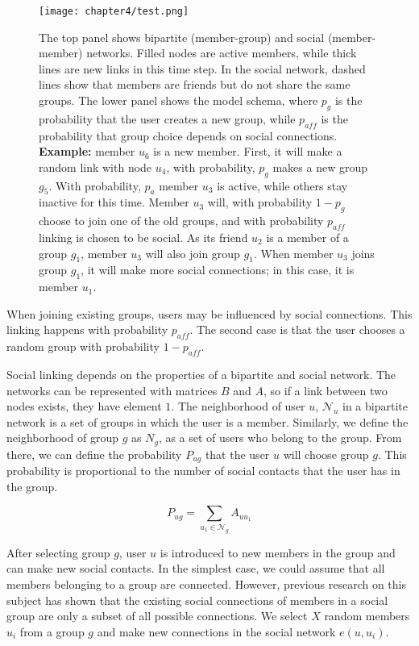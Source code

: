 \begin{figure}[h]
	\centering
	\texttt{[image: chapter4/test.png]}
	\caption[Bipartite groups growth model]{The top panel shows bipartite (member-group) and social (member-member) networks. Filled nodes are active members, while thick lines are new links in this time step. In the social network, dashed lines show that members are friends but do not share the same groups. The lower panel shows the model schema, where $p_g$ is the probability that the user creates a new group, while $p_{aff}$ is the probability that group choice depends on social connections. \textbf{Example:} member $u_6$ is a new member. First, it will make a random link with node $u_4$, with probability, $p_g$ makes a new group $g_5$. With probability, $p_a$ member $u_3$ is active, while others stay inactive for this time. Member $u_3$ will, with probability $1-p_g$ choose to join one of the old groups, and with probability $p_{aff}$ linking is chosen to be social. As its friend $u_2$ is a member of a group $g_1$, member $u_3$ will also join group $g_1$. When member $u_3$ joins group $g_1$, it will make more social connections; in this case, it is member $u_1$.}
	\label{fig:schema}
\end{figure}

When joining existing groups, users may be influenced by social connections. This linking happens with probability $p_{aff}$. The second case is that the user chooses a random group with probability $1-p_{aff}$. 

Social linking depends on the properties of a bipartite and social network. The networks can be represented with matrices $B$ and $A$, so if a link between two nodes exists, they have element $1$. The neighborhood of user $u$, $\mathcal{N}_{u}$ in a bipartite network is a set of groups in which the user is a member. Similarly, we define the neighborhood of group $g$ as $N_g$, as a set of users who belong to the group. From there, we can define the probability $ P_{ug}$ that the user $u$ will choose group $g$. This probability is proportional to the number of social contacts that the user has in the group. 

\begin{equation}
P_{ug}=\sum_{u_{1}\in \mathcal{N}_{g}} A_{uu_{1}} 
\label{eq1}
\end{equation}

After selecting group $g$, user $u$ is introduced to new members in the group and can make new social contacts. In the simplest case, we could assume that all members belonging to a group are connected. However, previous research on this subject \cite{ smiljanic2017associative, backstrom2006group, zheleva2009co} has shown that the existing social connections of members in a social group are only a subset of all possible connections. We select $X$ random members $u_i$ from a group $g$ and make new connections in the social network $e(u, u_i)$. 

